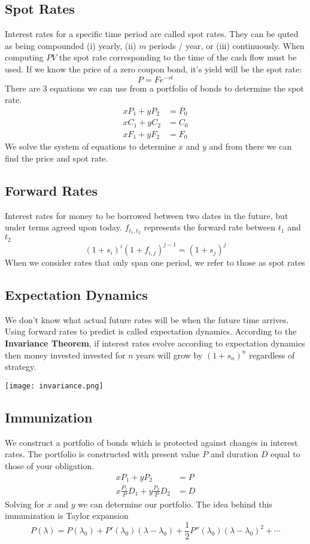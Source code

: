 \documentclass[11pt]{article}
\begin{document}
\subsection{Spot Rates}
Interest rates for a specific time period are called spot rates. They can be quted as being compounded (i) yearly, (ii) $m$ periods / year, or (iii) continuously.  When computing $PV$ the spot rate corresponding to the time of the cash flow must be used. If we know the price of a zero coupon bond, it's yield will be the spot rate:
$$ P = Fe^{-st}$$
There are 3 equations we can use from a portfolio of bonds to determine the spot rate. 
\begin{align*}
xP_1 + yP_2 &= P_0 \\ 
xC_1 +yC_2 &= C_0 \\ 
xF_1 + yF_2 &= F_0 
\end{align*}
We solve the system of equations to determine $x$  and $y$ and from there we can find the price and spot rate.
\subsection{Forward Rates}
Interest rates for money to be borrowed between two dates in the future, but under terms agreed upon today. $f_{t_1, t_2}$ represents the forward rate between $t_1$ and $t_2$ 
$$ (1+ s_i)^i (1 +f_{i,j})^{j-1} = (1+s_j)^j$$
When we consider rates that only span one period, we refer to those as spot rates 
\subsection{Expectation Dynamics}
We don't know what actual future rates will be when the future time arrives. Using forward rates to predict is called expectation dynamics.  According to the \textbf{Invariance Theorem}, if interest rates evolve according to expectation dynamics then money invested invested for $n$ years will grow by $(1+s_n)^n$ regardless of strategy.
\begin{center}
\texttt{[image: invariance.png]} 
\end{center}
\subsection{Immunization}
We construct a portfolio of bonds which is protected against changes in interest rates.  The portfolio is constructed with present value $P$ and duration $D$ equal to those of your obligation. 
\begin{align*}
xP_1 + yP_2 &= P \\
x \frac{P_1}{P} D_1 + y \frac{P_2}{P} D_2 &= D 
\end{align*}
Solving for $x$ and $y$ we can determine our portfolio. The idea behind this immunization is Taylor expansion
$$ P(\lambda) = P(\lambda_0) + P'(\lambda_0) (\lambda - \lambda_0) + \frac{1}{2} P'' (\lambda_0) (\lambda - \lambda_0)^2 + \cdots $$
\pagebreak
\end{document}
